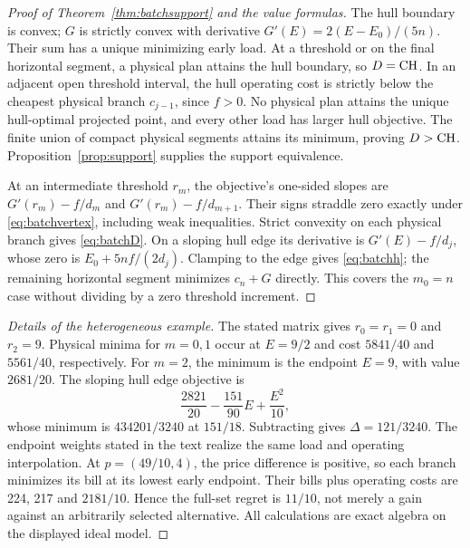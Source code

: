 \begin{proof}[Proof of Theorem~\ref{thm:batchsupport} and the value formulas]
The hull boundary is convex; $G$ is strictly convex with derivative
$G'(E)=2(E-E_0)/(5n)$. Their sum has a unique minimizing early load.
At a threshold or on the final horizontal segment, a physical plan attains
the hull boundary, so $D=\mathrm{CH}$. In an adjacent open threshold interval,
the hull operating cost is strictly below the cheapest physical branch
$c_{j-1}$, since $f>0$. No physical plan attains the unique hull-optimal
projected point, and every other load has larger hull objective. The
finite union of compact physical segments attains its minimum, proving
$D>\mathrm{CH}$. Proposition~\ref{prop:support} supplies the support equivalence.

At an intermediate threshold $r_m$, the objective's one-sided slopes are
$G'(r_m)-f/d_m$ and $G'(r_m)-f/d_{m+1}$. Their signs straddle zero
exactly under \eqref{eq:batchvertex}, including weak inequalities.
Strict convexity on each physical branch gives \eqref{eq:batchD}.
On a sloping hull edge its derivative is $G'(E)-f/d_j$, whose zero is
$E_0+5nf/(2d_j)$. Clamping to the edge gives \eqref{eq:batchh}; the
remaining horizontal segment minimizes $c_n+G$ directly. This covers
the $m_0=n$ case without dividing by a zero threshold increment.
\end{proof}

\begin{proof}[Details of the heterogeneous example]
The stated matrix gives $r_0=r_1=0$ and $r_2=9$. Physical minima for
$m=0,1$ occur at $E=9/2$ and cost $5841/40$ and $5561/40$,
respectively. For $m=2$, the minimum is the endpoint $E=9$, with value
$2681/20$. The sloping hull edge objective is
\[
 \frac{2821}{20}-\frac{151}{90}E+\frac{E^2}{10},
\]
whose minimum is $434201/3240$ at $151/18$. Subtracting gives
$\Delta=121/3240$. The endpoint weights stated in the text realize the
same load and operating interpolation. At $p=(49/10,4)$, the price
difference is positive, so each branch minimizes its bill at its lowest
early endpoint. Their bills plus operating costs are 224, 217 and
$2181/10$. Hence the full-set regret is $11/10$, not merely a gain
against an arbitrarily selected alternative. All calculations are exact
algebra on the displayed ideal model.
\end{proof}
